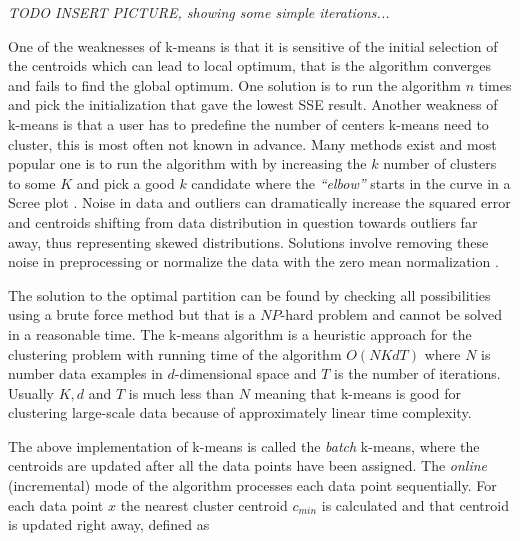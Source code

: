 \textit{TODO INSERT PICTURE, showing some simple iterations...}


One of the weaknesses of k-means is that it is sensitive of the initial selection of the centroids which can lead to local optimum, that is the algorithm converges and fails to find the global optimum. One solution is to run the algorithm $n$ times and pick the initialization that gave the lowest SSE result. Another weakness of k-means is that a user has to predefine the number of centers k-means need to cluster, this is most often not known in advance. Many methods exist and most popular one is to run the algorithm with by increasing the $k$ number of clusters to some $K$ and pick a good $k$ candidate where the \textit{``elbow''} starts in the curve in a Scree plot \citep{Han:2006DM}. Noise in data and outliers can dramatically increase the squared error and centroids shifting from data distribution in question towards outliers far away, thus representing skewed distributions. Solutions involve removing these noise in preprocessing or normalize the data with the zero mean normalization \citep{Xu:2005Clustering, Han:2006DM}.


The solution to the optimal partition can be found by checking all possibilities using a brute force method but that is a $NP$-hard problem \cite{Aloise:2009KmeansNPHard} and cannot be solved in a reasonable time. The k-means algorithm is a heuristic approach for the clustering problem with running time of the algorithm $O(NKdT)$ where $N$ is number data examples in $d$-dimensional space and $T$ is the number of iterations. Usually $K,d$ and $T$ is much less than $N$ meaning that k-means is good for clustering large-scale data because of approximately linear time complexity.

The above implementation of k-means is called the \textit{batch} k-means, where the centroids are updated after all the data points have been assigned. The \textit{online} (incremental) mode of the algorithm processes each data point sequentially. For each data point $x$ the nearest cluster centroid $c_{min}$ is calculated and that centroid is updated right away, defined as 

